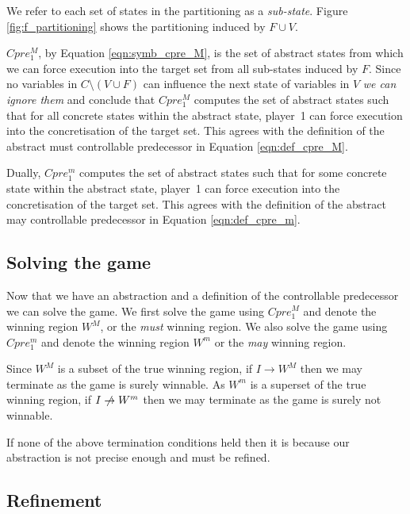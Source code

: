 We refer to each set of states in the partitioning as a \emph{sub-state}. Figure \ref{fig:f_partitioning} shows the partitioning induced by $F \cup V$.

$Cpre_1^M$, by Equation \ref{eqn:symb_cpre_M}, is the set of abstract states from which we can force execution into the target set from all sub-states induced by $F$. Since no variables in $C \setminus (V \cup F)$ can influence the next state of variables in $V$ \emph{we can ignore them} and conclude that $Cpre_1^M$ computes the set of abstract states such that for all concrete states within the abstract state, player~1 can force execution into the concretisation of the target set. This agrees with the definition of the abstract must controllable predecessor in Equation \ref{eqn:def_cpre_M}.

Dually, $Cpre_1^m$ computes the set of abstract states such that for some concrete state within the abstract state, player~1 can force execution into the concretisation of the target set. This agrees with the definition of the abstract may controllable predecessor in Equation \ref{eqn:def_cpre_m}.


\subsection{Solving the game}

Now that we have an abstraction and a definition of the controllable predecessor we can solve the game. We first solve the game using $Cpre_1^M$ and denote the winning region $W^M$, or the \emph{must} winning region. We also solve the game using $Cpre_1^m$ and denote the winning region $W^m$ or the \emph{may} winning region.

Since $W^M$ is a subset of the true winning region, if $I \rightarrow W^M$ then we may terminate as the game is surely winnable. As $W^m$ is a superset of the true winning region, if $I \centernot\rightarrow W^m$ then we may terminate as the game is surely not winnable.

If none of the above termination conditions held then it is because our abstraction is not precise enough and must be refined.


\subsection{Refinement}

